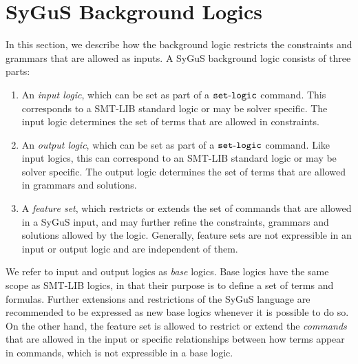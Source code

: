 \documentclass[english,a4paper,10pt]{article}
\begin{document}

\section{SyGuS Background Logics}
\label{sec:sygus-logic}

In this section,
we describe how the background logic
restricts the constraints and grammars that are allowed as inputs.
A SyGuS background logic consists of three parts:
\begin{enumerate}
\item An \emph{input logic}, which can be set as part of a ${\tt set\mbox{-}logic}$ command.
This corresponds to a SMT-LIB standard logic or may be solver specific.
The input logic determines the set of terms that are allowed in 
constraints.

\item An \emph{output logic}, which can be set as part of a ${\tt set\mbox{-}logic}$ command.
Like input logics, this
can correspond to an SMT-LIB standard logic or may be solver specific.
The output logic determines the set of terms that are allowed in
grammars and solutions.

\item A \emph{feature set}, 
which restricts or extends the set of commands that are allowed in a SyGuS input,
and may further refine the constraints, grammars and solutions allowed by the logic.
Generally, feature sets are not expressible in an input or output logic
and are independent of them.
\end{enumerate}
We refer to input and output logics as \emph{base} logics.
Base logics have the same scope as SMT-LIB logics, in that their purpose is to
define a set of terms and formulas.
Further extensions and restrictions of the SyGuS language are recommended
to be expressed as new base logics whenever it is possible to do so.
On the other hand,
the feature set is allowed to restrict or extend the
\emph{commands} that are allowed in the input
or specific relationships between how terms appear in commands,
which is not expressible in a base logic.
\end{document}
